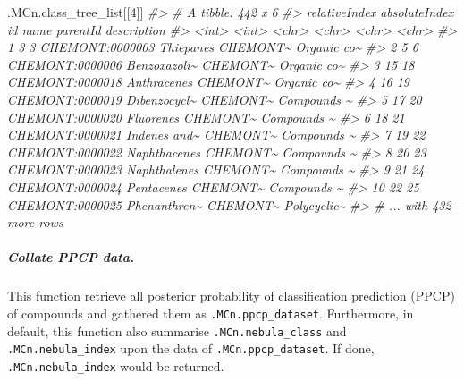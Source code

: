 \documentclass[]{tufte-handout}
\newenvironment{Shaded}{}{}
\newcommand{\CommentTok}[1]{\textcolor[rgb]{0.38,0.63,0.69}{\textit{#1}}}
\newcommand{\DecValTok}[1]{\textcolor[rgb]{0.25,0.63,0.44}{#1}}
\newcommand{\NormalTok}[1]{#1}
\begin{document}
\begin{Shaded}
\begin{Highlighting}[]
\NormalTok{.MCn.class\_tree\_list[[}\DecValTok{4}\NormalTok{]]}
\CommentTok{\#\textgreater{} \# A tibble: 442 x 6}
\CommentTok{\#\textgreater{}    relativeIndex absoluteIndex id              name         parentId description}
\CommentTok{\#\textgreater{}            \textless{}int\textgreater{}         \textless{}int\textgreater{} \textless{}chr\textgreater{}           \textless{}chr\textgreater{}        \textless{}chr\textgreater{}    \textless{}chr\textgreater{}      }
\CommentTok{\#\textgreater{}  1             3             3 CHEMONT:0000003 Thiepanes    CHEMONT\textasciitilde{} Organic co\textasciitilde{}}
\CommentTok{\#\textgreater{}  2             5             6 CHEMONT:0000006 Benzoxazoli\textasciitilde{} CHEMONT\textasciitilde{} Organic co\textasciitilde{}}
\CommentTok{\#\textgreater{}  3            15            18 CHEMONT:0000018 Anthracenes  CHEMONT\textasciitilde{} Organic co\textasciitilde{}}
\CommentTok{\#\textgreater{}  4            16            19 CHEMONT:0000019 Dibenzocycl\textasciitilde{} CHEMONT\textasciitilde{} Compounds \textasciitilde{}}
\CommentTok{\#\textgreater{}  5            17            20 CHEMONT:0000020 Fluorenes    CHEMONT\textasciitilde{} Compounds \textasciitilde{}}
\CommentTok{\#\textgreater{}  6            18            21 CHEMONT:0000021 Indenes and\textasciitilde{} CHEMONT\textasciitilde{} Compounds \textasciitilde{}}
\CommentTok{\#\textgreater{}  7            19            22 CHEMONT:0000022 Naphthacenes CHEMONT\textasciitilde{} Compounds \textasciitilde{}}
\CommentTok{\#\textgreater{}  8            20            23 CHEMONT:0000023 Naphthalenes CHEMONT\textasciitilde{} Compounds \textasciitilde{}}
\CommentTok{\#\textgreater{}  9            21            24 CHEMONT:0000024 Pentacenes   CHEMONT\textasciitilde{} Compounds \textasciitilde{}}
\CommentTok{\#\textgreater{} 10            22            25 CHEMONT:0000025 Phenanthren\textasciitilde{} CHEMONT\textasciitilde{} Polycyclic\textasciitilde{}}
\CommentTok{\#\textgreater{} \# ... with 432 more rows}
\end{Highlighting}
\end{Shaded}

\hypertarget{collate-ppcp-data.}{%
\subparagraph{Collate PPCP data.}\label{collate-ppcp-data.}}

This function retrieve all posterior probability of classification
prediction (PPCP) of compounds and gathered them as
\texttt{.MCn.ppcp\_dataset}. Furthermore, in default, this function also
summarise \texttt{.MCn.nebula\_class} and \texttt{.MCn.nebula\_index}
upon the data of \texttt{.MCn.ppcp\_dataset}. If done,
\texttt{.MCn.nebula\_index} would be returned.
\end{document}

